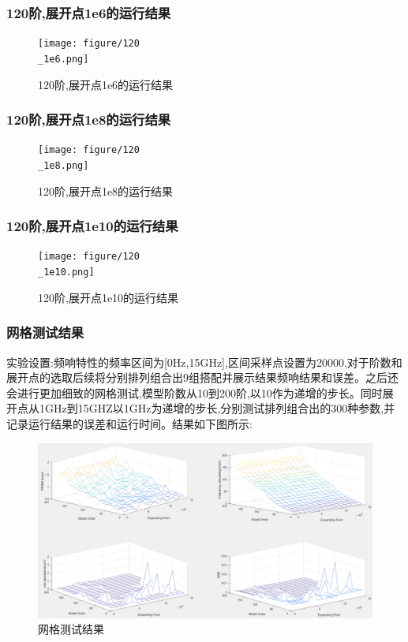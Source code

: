 \documentclass[12pt]{article}
\begin{document}
\begin{sloppypar}
\subsubsection{120阶,展开点1e6的运行结果}
\begin{figure}[H]
  \centering
  \texttt{[image: figure/120\\\_1e6.png]}
  \caption{120阶,展开点1e6的运行结果}
\end{figure}

\subsubsection{120阶,展开点1e8的运行结果}
\begin{figure}[H]
  \centering
  \texttt{[image: figure/120\\\_1e8.png]}
  \caption{120阶,展开点1e8的运行结果}
\end{figure}

\subsubsection{120阶,展开点1e10的运行结果}
\begin{figure}[H]
  \centering
  \texttt{[image: figure/120\\\_1e10.png]}
  \caption{120阶,展开点1e10的运行结果}
\end{figure}


\subsubsection{网格测试结果}
\qquad 实验设置:频响特性的频率区间为[0Hz,15GHz],区间采样点设置为20000,对于阶数和展开点的选取后续将分别排列组合出9组搭配并展示结果频响结果和误差。之后还会进行更加细致的网格测试,模型阶数从10到200阶,以10作为递增的步长。同时展开点从1GHz到15GHZ以1GHz为递增的步长,分别测试排列组合出的300种参数,并记录运行结果的误差和运行时间。结果如下图所示:
\begin{figure}[H]
  \centering
  \includegraphics[width=0.9\columnwidth]{figure/comparison.png}
  \caption{网格测试结果}
\end{figure}


\end{sloppypar}
\end{document}
